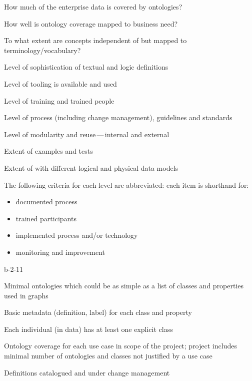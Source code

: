 \begin{maturity-dimensions}

    \item How much of the enterprise data is covered by ontologies?
    \item How well is ontology coverage mapped to business need?
    \item To what extent are concepts independent of but mapped to terminology/vocabulary?
    \item Level of sophistication of textual and logic definitions
    \item Level of tooling is available and used
    \item Level of training and trained people
    \item Level of process (including change management), guidelines and standards
    \item Level of modularity and reuse\,---\,internal and external
    \item Extent of examples and tests
    \item Extent of  with different logical and physical data models
    
\end{maturity-dimensions}

\ekgmmCapabilitySectionLevels

The following criteria for each level are abbreviated: each item is shorthand for:

\begin{itemize}
    \item documented process
    \item trained participants
    \item implemented process and/or technology
    \item monitoring and improvement
\end{itemize}

\ekgmmCapabilitySectionLevelsOneFive

\begin{level-assessment}{b-2-1}{1}

    \item Minimal ontologies which could be as simple as a list of classes and properties used in graphs
    \item Basic metadata (definition, label) for each class and property
    \item Each individual (in data) has at least one explicit class
    \item Ontology coverage for each use case in scope of the project;
          project includes minimal number of ontologies and classes not justified by a use case
    \item Definitions catalogued and under change management

\end{level-assessment}

